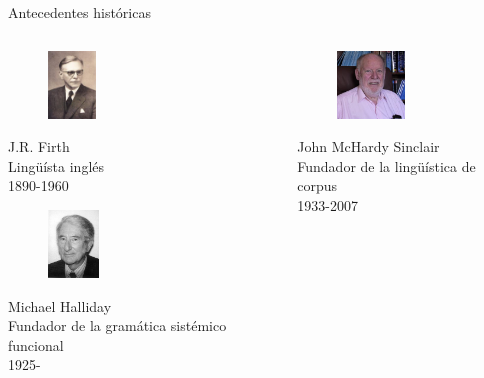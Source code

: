 \documentclass{beamer}
\begin{document}
\begin{frame}{Antecedentes históricas}
    \begin{columns}
        \begin{column}{6cm}
            \begin{figure}
            \includegraphics[height=1.8cm]{firth.png}
            \end{figure}
            \begin{center}
                \tiny
                J.R. Firth \\
                Lingüísta inglés \\
                1890-1960\\
            \end{center}
            \begin{figure}
                \includegraphics[height=1.8cm]{halliday.jpg}
            \end{figure}
            \begin{center}
                \tiny
                Michael Halliday \\
                Fundador de la gramática sistémico funcional \\
                1925-\\
            \end{center}
        \end{column}
        \begin{column}{6cm}
            \begin{flushleft}
            \begin{figure}
                \includegraphics[height=1.8cm]{sinclair.jpg}
            \end{figure}
            \begin{center}
            \tiny
            John McHardy Sinclair \\
            Fundador de la lingüística de corpus \\
            1933-2007\\
            \end{center}
            \end{flushleft}
        \end{column}
    \end{columns}
\end{frame}
\end{document}
